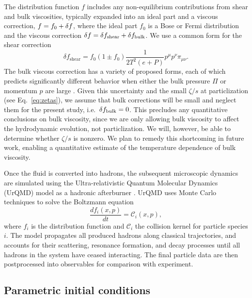\documentclass[aps,prc,reprint,amsmath,nofootinbib]{revtex4-1}
\begin{document}
The distribution function $f$ includes any non-equilibrium contributions from shear and bulk viscosities, typically expanded into an ideal part and a viscous correction, $f = f_0 + \delta f$, where the ideal part $f_0$ is a Bose or Fermi distribution and the viscous correction $\delta f = \delta f_\text{shear} + \delta f_\text{bulk}$.
We use a common form for the shear correction \cite{Teaney:2003kp}
\begin{equation}
  \delta f_\text{shear} = f_0(1 \pm f_0) \frac{1}{2T^2(e+P)} p^\mu p^\nu \pi_{\mu\nu}.
\end{equation}
The bulk viscous correction has a variety of proposed forms, each of which predicts significantly different behavior when either the bulk pressure $\Pi$ or momentum $p$ are large \cite{Dusling:2011fd, Noronha-Hostler:2013gga}.
Given this uncertainty and the small $\zeta/s$ at particlization (see Eq.~\eqref{eq:zetas}), we assume that bulk corrections will be small and neglect them for the present study, i.e.\ $\delta f_\text{bulk} = 0$.
This precludes any quantitative conclusions on bulk viscosity, since we are only allowing bulk viscosity to affect the hydrodynamic evolution, not particlization.
We will, however, be able to determine whether $\zeta/s$ is nonzero.
We plan to remedy this shortcoming in future work, enabling a quantitative estimate of the temperature dependence of bulk viscosity.

Once the fluid is converted into hadrons, the subsequent microscopic dynamics are simulated using the Ultra-relativistic Quantum Molecular Dynamics (UrQMD) model as a hadronic afterburner \cite{Bass:1998ca, Bleicher:1999xi}.
UrQMD uses Monte Carlo techniques to solve the Boltzmann equation
\begin{equation}
  \frac{df_i(x,p)}{dt} = \mathcal{C}_i(x, p),
\end{equation}
where $f_i$ is the distribution function and $\mathcal{C}_i$ the collision kernel for particle species $i$.
The model propagates all produced hadrons along classical trajectories, and accounts for their scattering, resonance formation, and decay processes until all hadrons in the system have ceased interacting.
The final particle data are then postprocessed into observables for comparison with experiment.

\subsection{Parametric initial conditions}
\end{document}
